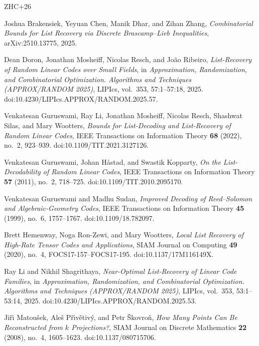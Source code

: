 \documentclass{amsart}
\theoremstyle{definition}
\theoremstyle{remark}
\begin{document}
\begin{thebibliography}{ZHC+26}

Joshua Brakensiek, Yeyuan Chen, Manik Dhar, and Zihan Zhang,
\emph{Combinatorial Bounds for List Recovery via Discrete Brascamp--Lieb Inequalities},
arXiv:2510.13775, 2025.

Dean Doron, Jonathan Mosheiff, Nicolas Resch, and Jo\~ao Ribeiro,
\emph{List-Recovery of Random Linear Codes over Small Fields},
in \emph{Approximation, Randomization, and Combinatorial Optimization. Algorithms and Techniques (APPROX/RANDOM 2025)},
LIPIcs, vol.~353, 57:1--57:18, 2025.
doi:10.4230/LIPIcs.APPROX/RANDOM.2025.57.

Venkatesan Guruswami, Ray Li, Jonathan Mosheiff, Nicolas Resch, Shashwat Silas, and Mary Wootters,
\emph{Bounds for List-Decoding and List-Recovery of Random Linear Codes},
IEEE Transactions on Information Theory \textbf{68} (2022), no.~2, 923--939.
doi:10.1109/TIT.2021.3127126.

Venkatesan Guruswami, Johan H\aa stad, and Swastik Kopparty,
\emph{On the List-Decodability of Random Linear Codes},
IEEE Transactions on Information Theory \textbf{57} (2011), no.~2, 718--725.
doi:10.1109/TIT.2010.2095170.

Venkatesan Guruswami and Madhu Sudan,
\emph{Improved Decoding of Reed--Solomon and Algebraic-Geometry Codes},
IEEE Transactions on Information Theory \textbf{45} (1999), no.~6, 1757--1767.
doi:10.1109/18.782097.

Brett Hemenway, Noga Ron-Zewi, and Mary Wootters,
\emph{Local List Recovery of High-Rate Tensor Codes and Applications},
SIAM Journal on Computing \textbf{49} (2020), no.~4, FOCS17-157--FOCS17-195.
doi:10.1137/17M116149X.

Ray Li and Nikhil Shagrithaya,
\emph{Near-Optimal List-Recovery of Linear Code Families},
in \emph{Approximation, Randomization, and Combinatorial Optimization. Algorithms and Techniques (APPROX/RANDOM 2025)},
LIPIcs, vol.~353, 53:1--53:14, 2025.
doi:10.4230/LIPIcs.APPROX/RANDOM.2025.53.

Ji\v{r}\'{\i} Matou\v{s}ek, Ale\v{s} P\v{r}\'{\i}v\v{e}tiv\'y, and Petr \v{S}kovro\v{n},
\emph{How Many Points Can Be Reconstructed from \(k\) Projections?},
SIAM Journal on Discrete Mathematics \textbf{22} (2008), no.~4, 1605--1623.
doi:10.1137/080715706.


\end{thebibliography}
\end{document}
